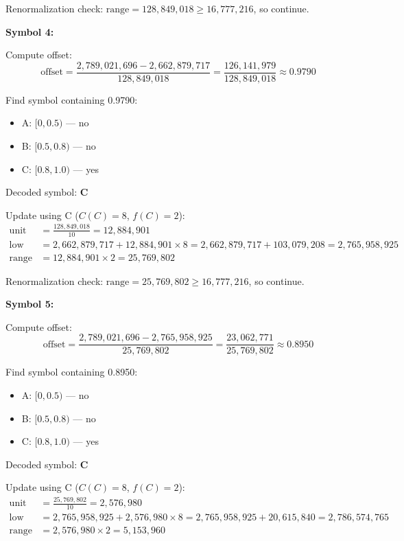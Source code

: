 \documentclass[12pt]{article}
\begin{document}
Renormalization check: $\text{range} = 128{,}849{,}018 \ge 16{,}777{,}216$, so continue.

\vspace{2mm}
\textbf{Symbol 4:}

Compute offset:
\[
\text{offset} = \frac{2{,}789{,}021{,}696 - 2{,}662{,}879{,}717}{128{,}849{,}018} = \frac{126{,}141{,}979}{128{,}849{,}018} \approx 0.9790
\]

Find symbol containing 0.9790:
\begin{itemize}
    \item A: $[0, 0.5)$ — no
    \item B: $[0.5, 0.8)$ — no
    \item C: $[0.8, 1.0)$ — yes
\end{itemize}

Decoded symbol: \textbf{C}

Update using C ($C(C)=8$, $f(C)=2$):
\begin{align*}
\text{unit} &= \frac{128{,}849{,}018}{10} = 12{,}884{,}901 \\
\text{low} &= 2{,}662{,}879{,}717 + 12{,}884{,}901 \times 8 = 2{,}662{,}879{,}717 + 103{,}079{,}208 = 2{,}765{,}958{,}925 \\
\text{range} &= 12{,}884{,}901 \times 2 = 25{,}769{,}802
\end{align*}

Renormalization check: $\text{range} = 25{,}769{,}802 \ge 16{,}777{,}216$, so continue.

\vspace{2mm}
\textbf{Symbol 5:}

Compute offset:
\[
\text{offset} = \frac{2{,}789{,}021{,}696 - 2{,}765{,}958{,}925}{25{,}769{,}802} = \frac{23{,}062{,}771}{25{,}769{,}802} \approx 0.8950
\]

Find symbol containing 0.8950:
\begin{itemize}
    \item A: $[0, 0.5)$ — no
    \item B: $[0.5, 0.8)$ — no
    \item C: $[0.8, 1.0)$ — yes
\end{itemize}

Decoded symbol: \textbf{C}

Update using C ($C(C)=8$, $f(C)=2$):
\begin{align*}
\text{unit} &= \frac{25{,}769{,}802}{10} = 2{,}576{,}980 \\
\text{low} &= 2{,}765{,}958{,}925 + 2{,}576{,}980 \times 8 = 2{,}765{,}958{,}925 + 20{,}615{,}840 = 2{,}786{,}574{,}765 \\
\text{range} &= 2{,}576{,}980 \times 2 = 5{,}153{,}960
\end{align*}
\end{document}

